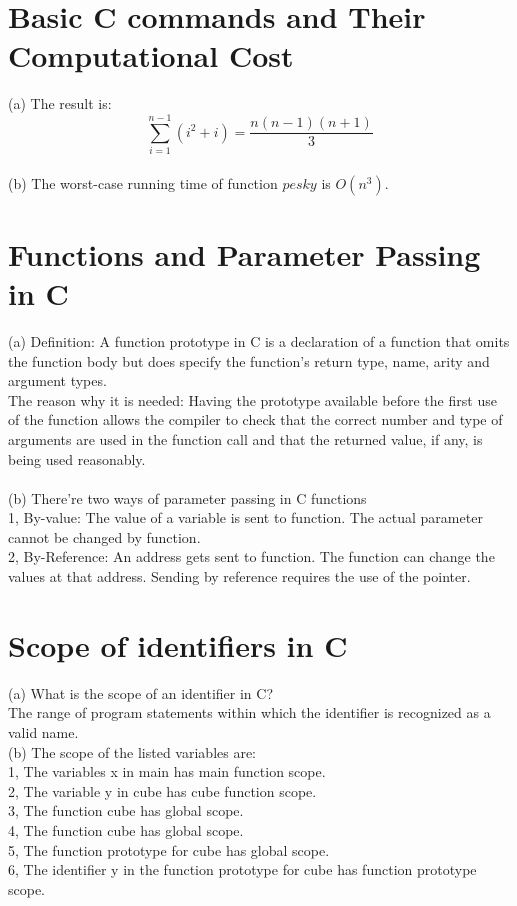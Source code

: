 \documentclass[11pt]{article}
\begin{document}
\section{Basic C commands and Their Computational Cost}
(a) The result is:\\
\begin{equation*}
\sum_{i=1}^{n-1}(i^2+i)=\frac{n(n-1)(n+1)}{3}
\end{equation*}
\\
(b) The worst-case running time of function $pesky$ is $O(n^3)$.

\section{Functions and Parameter Passing in C}
(a) Definition: A function prototype in C is a declaration of a function that omits the function body but does specify the function's return type, name, arity and argument types.\\
The reason why it is needed:
Having the prototype available before the first use of the function allows the compiler to check that the correct number and type of arguments are used in the function call and that the returned value, if any, is being used reasonably.\\
\\
(b) There're two ways of parameter passing in C functions\\
1, By-value: The value of a variable is sent to function. The actual parameter cannot be changed by function.\\
2, By-Reference: An address gets sent to function. The function can change the values at that address. Sending by reference requires the use of the pointer.\\

\section{Scope of identifiers in C}
(a) What is the scope of an identifier in C?\\
The range of program statements within which the identifier is recognized as a valid name.\\
(b) The scope of the listed variables are:\\
1, The variables x in main has main function scope.\\
2, The variable y in cube has cube function scope.\\
3, The function cube has global scope.\\
4, The function cube has global scope.\\
5, The function prototype for cube has global scope.\\
6, The identifier y in the function prototype for cube has function prototype scope.\\
\end{document}
